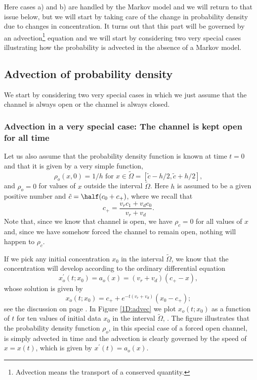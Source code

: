 Here cases a) and b) are handled by the Markov model and we will return to
that issue below, but we will start by taking care of the change in
probability density due to changes in concentration. It turns out that this part will be governed by an advection\footnote{Advection means the transport of a conserved quantity.} equation and we will start by considering two very special cases illustrating how the probability is advected in the absence of a Markov model. 

\subsection{Advection of probability density}
\label{advectprobability}

We start by considering two very special cases in which we just assume that the channel is always open or the channel is always closed. 

\subsubsection{Advection in a very special case: The channel is kept open for all time}
 Let us also assume that the probability density function is known at time $t=0$ and that it is given by a very simple function,
\begin{equation}
 \rho_o (x,0)=1/h \text{ for } x\in \tilde{\Omega} = [\tilde{c}-h/2,\tilde{c}+h/2 ],  \label{adv_ode_open_init}
 \end{equation}
and $\rho_o=0$ for values of $x$ outside the interval $\tilde{\Omega}$. Here $h$ is assumed to be a given positive number and $\tilde{c}=\half (c_0+c_+)$, where we recall that
\[
c_{+}=\frac{v_{r}c_{1}+v_{d}c_{0}}{v_{r}+v_{d}}.
\]
Note that, since we know that  channel is open, we have $\rho_c=0$ for all values of $x$ and, since we have somehow forced the channel to remain open, nothing will happen to $\rho_c$. 

If we pick any initial concentration $x_0$ in the interval
$\tilde{\Omega}$, we know that the concentration will develop according to the ordinary differential equation
\begin{equation}
x^{\prime}_o(t;x_0)=a_o(x)=(v_{r}+v_{d})\left(c_{+}-x\right), \label{adv_ode_open}
\end{equation}
whose solution is given by
\[
x_o(t;x_0)=c_{+}+e^{-t\left(  v_{r}+v_{d}\right)}\left(  x_{0}-c_{+}\right);
\]
see the discussion on page \pageref{open600}. In Figure \ref{1D:advec}
we plot $x_o(t;x_0)$ as a function of $t$ for ten values of initial data $x_0$ in the interval $\tilde{\Omega}$, . The figure illustrates that the probability density function 
$\rho_o$, in this special case of a forced open channel, is simply advected in time and the advection is clearly governed by the speed of $x=x(t)$, which is given by $x^{\prime}(t)=a_o(x)$.

